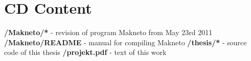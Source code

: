 \chapter{CD Content}
\textbf{/Makneto/*} - revision of program Makneto from May 23rd 2011\newline
\textbf{/Makneto/README} - manual for compiling Makneto\newline
\textbf{/thesis/*} - source code of this thesis\newline
\textbf{/projekt.pdf} - text of this work\newline

